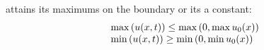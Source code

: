 \begin{principbox}\nospacing
    \begin{princip}\label{princip:maximum_principle}
         attains its maximums on the boundary or its a constant:
        \begin{align}
          &\max\left(u(x,t)\right)\leq\max\left(0,\max u_{0}(x)\right)\label{eq:maximum_principle_inviscid_conservation_law}\\[-1\jot]
          &\min\left(u(x,t)\right)\geq\min\left(0,\min u_{0}(x)\right)
        \end{align}
        \begin{figure}[H]
            \centering{
              \vspace{-0.3em}
              \def\svgwidth{100pt}
              \resizebox{0.4\linewidth}{!}{}
            }
        \end{figure}
    \end{princip}
\end{principbox}
